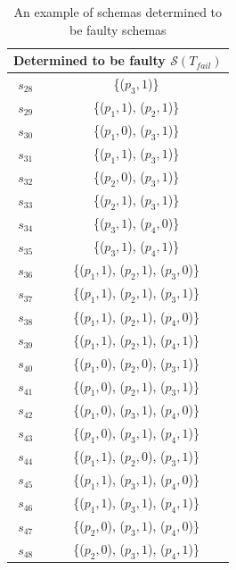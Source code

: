 \begin{table}[htbp]
  \centering
  \caption{An example of schemas determined to be faulty schemas}
  \label{ex:determinablefaultyschemas}
    \begin{tabular}{|c|c|} \hline
  \multicolumn{2}{|c|}{\textbf{Determined to be faulty $\mathcal{S}(T_{fail})$ }}  \\ \hline
   $s_{28}$ & \{($p_{3}, 1$)\}  \\
   $s_{29}$ & \{($p_{1}, 1$), ($p_{2}, 1$)\}  \\

   $s_{30}$ & \{($p_{1}, 0$), ($p_{3}, 1$)\}  \\
   $s_{31}$ & \{($p_{1}, 1$), ($p_{3}, 1$)\}  \\

   $s_{32}$ & \{($p_{2}, 0$), ($p_{3}, 1$)\}  \\
   $s_{33}$ & \{($p_{2}, 1$), ($p_{3}, 1$)\}  \\

   $s_{34}$ & \{($p_{3}, 1$), ($p_{4}, 0$)\}  \\
   $s_{35}$ & \{($p_{3}, 1$), ($p_{4}, 1$)\}  \\

   $s_{36}$ & \{($p_{1}, 1$), ($p_{2}, 1$), ($p_{3}, 0$)\}  \\
   $s_{37}$ & \{($p_{1}, 1$), ($p_{2}, 1$), ($p_{3}, 1$)\}  \\
   $s_{38}$ & \{($p_{1}, 1$), ($p_{2}, 1$), ($p_{4}, 0$)\}  \\
   $s_{39}$ & \{($p_{1}, 1$), ($p_{2}, 1$), ($p_{4}, 1$)\}  \\

   $s_{40}$ & \{($p_{1}, 0$), ($p_{2}, 0$), ($p_{3}, 1$)\}  \\
   $s_{41}$ & \{($p_{1}, 0$), ($p_{2}, 1$), ($p_{3}, 1$)\}  \\
   $s_{42}$ & \{($p_{1}, 0$), ($p_{3}, 1$), ($p_{4}, 0$)\}  \\
   $s_{43}$ & \{($p_{1}, 0$), ($p_{3}, 1$), ($p_{4}, 1$)\}  \\

   $s_{44}$ & \{($p_{1}, 1$), ($p_{2}, 0$), ($p_{3}, 1$)\}  \\
   $s_{45}$ & \{($p_{1}, 1$), ($p_{3}, 1$), ($p_{4}, 0$)\}  \\
   $s_{46}$ & \{($p_{1}, 1$), ($p_{3}, 1$), ($p_{4}, 1$)\}  \\

   $s_{47}$ & \{($p_{2}, 0$), ($p_{3}, 1$), ($p_{4}, 0$)\}  \\
   $s_{48}$ & \{($p_{2}, 0$), ($p_{3}, 1$), ($p_{4}, 1$)\}  \\


\end{tabular}
\end{table}
